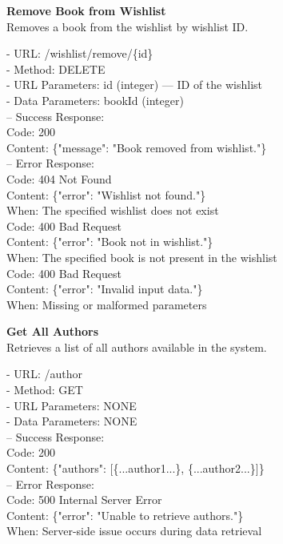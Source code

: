 \begin{flushleft}
    \textbf{Remove Book from Wishlist} \\
    Removes a book from the wishlist by wishlist ID.

    - URL: /wishlist/remove/\{id\} \\
    - Method: DELETE \\
    - URL Parameters: id (integer) — ID of the wishlist \\
    - Data Parameters: bookId (integer) \\
    – Success Response: \\
    Code: 200 \\
    Content: \{"message": "Book removed from wishlist."\} \\
    – Error Response: \\
    Code: 404 Not Found \\
    Content: \{"error": "Wishlist not found."\} \\
    When: The specified wishlist does not exist \\
    Code: 400 Bad Request \\
    Content: \{"error": "Book not in wishlist."\} \\
    When: The specified book is not present in the wishlist \\
    Code: 400 Bad Request \\
    Content: \{"error": "Invalid input data."\} \\
    When: Missing or malformed parameters
\end{flushleft}

\begin{flushleft}
    \textbf{Get All Authors} \\
    Retrieves a list of all authors available in the system.

    - URL: /author \\
    - Method: GET \\
    - URL Parameters: NONE \\
    - Data Parameters: NONE \\
    – Success Response: \\
    Code: 200 \\
    Content: \{"authors": [\{...author1...\}, \{...author2...\}]\} \\
    – Error Response: \\
    Code: 500 Internal Server Error \\
    Content: \{"error": "Unable to retrieve authors."\} \\
    When: Server-side issue occurs during data retrieval
\end{flushleft}

